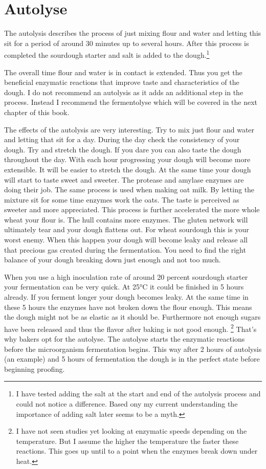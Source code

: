 \section{Autolyse}

The autolysis describes the process of just mixing flour and water and letting
this sit for a period of around 30 minutes up to several hours. After this
process is completed the sourdough starter and salt is added to the
dough.\footnote{I have tested adding the salt at the start and end of the
autolysis process and could not notice a difference. Based ony my current
understanding the importance of adding salt later seems to be a myth.}

The overall time flour and water is in contact is extended. Thus you get the
beneficial enzymatic reactions that improve taste and characteristics of the
dough. I do not recommend an autolysis as it adds an additional step in the
process. Instead I recommend the fermentolyse which will be covered in the
next chapter of this book.

The effects of the autolysis are very interesting. Try to mix just flour and
water and letting that sit for a day. During the day check the consistency of
your dough. Try and stretch the dough. If you dare you can also taste the
dough throughout the day. With each hour progressing your dough will become
more extensible. It will be easier to stretch the dough. At the same time your
dough will start to taste sweet and sweeter. The protease and amylase enzymes
are doing their job. The same process is used when making oat milk. By letting
the mixture sit for some time enzymes work the oats. The taste is perceived as
sweeter and more appreciated. This process is further accelerated the more
whole wheat your flour is. The hull contains more enzymes. The gluten network
will ultimately tear and your dough flattens out. For wheat sourdough this is
your worst enemy. When this happen your dough will become leaky and release
all that precious gas created during the fermentation. You need to find the
right balance of your dough breaking down just enough and not too much.

When you use a high inoculation rate of around 20 percent sourdough starter
your fermentation can be very quick. At 25°C it could be finished in 5 hours
already. If you ferment longer your dough becomes leaky. At the same time in
these 5 hours the enzymes have not broken down the flour enough. This means
the dough might not be as elastic as it should be. Furthermore not enough
sugars have been released and thus the flavor after baking is not good enough.
\footnote{I have not seen studies yet looking at enzymatic speeds depending on
the temperature. But I assume the higher the temperature the faster these
reactions. This goes up until to a point when the enzymes break down under
heat.} That's why bakers opt for the autolyse. The autolyse starts the enzymatic
reactions before the microorganism fermentation begins. This way after 2 hours
of autolysis (an example) and 5 hours of fermentation the dough is in the
perfect state before beginning proofing.

